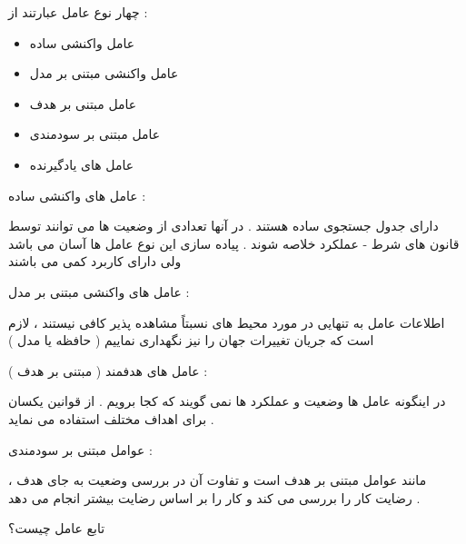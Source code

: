 \documentclass[12pt]{article}
\begin{document}
\begin{tcolorbox}
چهار نوع عامل عبارتند از :

\begin{itemize}
	\item عامل واکنشی ساده
	\item عامل واکنشی مبتنی بر مدل
	\item عامل مبتنی بر هدف
	\item عامل مبتنی بر سودمندی
	\item عامل های یادگیرنده
\end{itemize}



\noindent
عامل های واکنشی ساده 
 :

\noindent
دارای جدول جستجوی ساده هستند . در آنها تعدادی از وضعیت ها می توانند توسط قانون های شرط - عملکرد خلاصه شوند . پیاده سازی این نوع عامل ها آسان می باشد ولی دارای کاربرد کمی می باشند 


\vspace{10pt}

\noindent
عامل های واکنشی مبتنی بر مدل 
 :

\noindent
اطلاعات عامل به تنهایی در مورد محیط های نسبتاً مشاهده پذیر کافی نیستند ، لازم است که جریان تغییرات جهان را نیز نگهداری نماییم ( حافظه یا مدل )


\vspace{10pt}



\noindent
عامل های هدفمند ( مبتنی بر هدف ) 
 :

\noindent
در اینگونه عامل ها وضعیت و عملکرد ها نمی گویند که کجا برویم . از قوانین یکسان برای اهداف مختلف استفاده می نماید .


\vspace{10pt}



\noindent
عوامل مبتنی بر سودمندی 
 :

\noindent
مانند عوامل مبتنی بر هدف است و تفاوت آن در بررسی وضعیت به جای هدف ، رضایت کار را بررسی می کند و کار را بر اساس رضایت بیشتر انجام می دهد . 


\end{tcolorbox}



\newpage
\vspace{20pt}
\noindent
تابع عامل چیست؟
\end{document}
